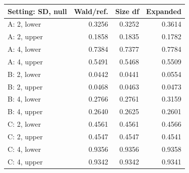 \begin{tabular}{@{}lrrr@{}}
\toprule
Setting: SD, null & Wald/ref. & Size df & Expanded\\
\midrule
A: 2, lower & 0.3256 & 0.3252 & 0.3614\\
A: 2, upper & 0.1858 & 0.1835 & 0.1782\\
A: 4, lower & 0.7384 & 0.7377 & 0.7784\\
A: 4, upper & 0.5491 & 0.5468 & 0.5509\\
B: 2, lower & 0.0442 & 0.0441 & 0.0554\\
B: 2, upper & 0.0468 & 0.0463 & 0.0473\\
B: 4, lower & 0.2766 & 0.2761 & 0.3159\\
B: 4, upper & 0.2640 & 0.2625 & 0.2601\\
C: 2, lower & 0.4561 & 0.4561 & 0.4566\\
C: 2, upper & 0.4547 & 0.4547 & 0.4541\\
C: 4, lower & 0.9356 & 0.9356 & 0.9358\\
C: 4, upper & 0.9342 & 0.9342 & 0.9341\\
\bottomrule
\end{tabular}
